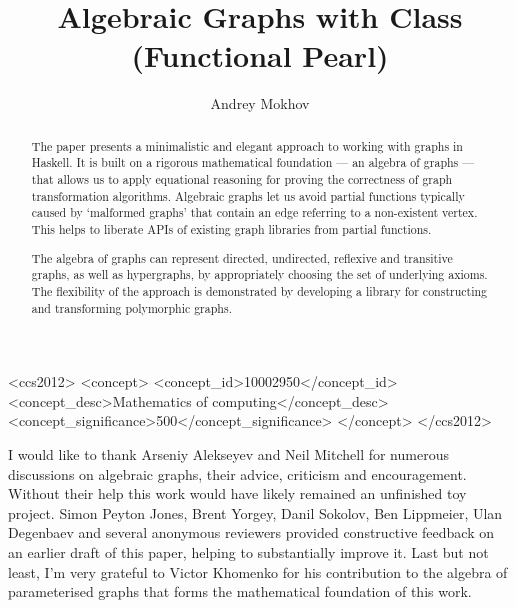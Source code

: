 \documentclass[sigplan,screen,9pt]{acmart}
\begin{document}
\title{Algebraic Graphs with Class (Functional Pearl)}

\author{Andrey Mokhov}

\begin{abstract}
\vspace{-0.5mm}
The paper presents a minimalistic and elegant approach to working
with graphs in Haskell. It is built on a rigorous
mathematical foundation --- an algebra of graphs --- that allows us to apply
equational reasoning for proving the correctness of graph transformation
algorithms. Algebraic graphs let us avoid partial functions typically
caused by `malformed graphs' that contain an edge referring to
a non-existent vertex. This helps to liberate APIs of existing graph libraries
from partial functions.

The algebra of graphs can represent directed, undirected, reflexive
and transitive graphs, as well as hypergraphs, by appropriately choosing
the set of underlying axioms. The flexibility of the approach is
demonstrated by developing a library for constructing
and transforming polymorphic graphs.\vspace{-1mm}
\end{abstract}

\begin{CCSXML}
<ccs2012>
<concept>
<concept_id>10002950</concept_id>
<concept_desc>Mathematics of computing</concept_desc>
<concept_significance>500</concept_significance>
</concept>
</ccs2012>
\end{CCSXML}


\maketitle









\begin{acks}
  I would like to thank Arseniy Alekseyev and Neil Mitchell
  for numerous discussions on algebraic graphs, their advice,
  criticism and encouragement. Without their help this work would
  have likely remained an unfinished toy project.
  Simon Peyton Jones, Brent Yorgey, Danil Sokolov, Ben Lippmeier, Ulan Degenbaev
  and several anonymous reviewers provided constructive feedback on an
  earlier draft of this paper, helping to substantially improve it. Last but
  not least, I'm very grateful to Victor Khomenko for his contribution to the
  algebra of parameterised graphs that forms the mathematical foundation of this work.
\end{acks}


\end{document}
